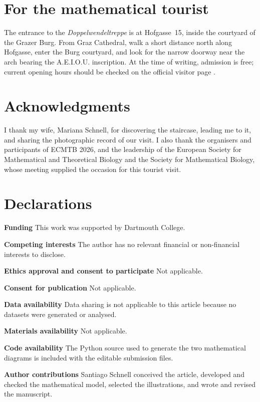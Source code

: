 \documentclass[pdflatex,sn-mathphys-num]{sn-jnl}
\begin{document}
\section{For the mathematical tourist}
The entrance to the \emph{Doppelwendeltreppe} is at Hofgasse~15, inside the courtyard of
the Grazer Burg. From Graz Cathedral, walk a short distance north along Hofgasse,
enter the Burg courtyard, and look for the narrow doorway near the arch bearing
the A.E.I.O.U. inscription. At the time of writing, admission is free; current
opening hours should be checked on the official visitor page
\citep{GrazTourismus}.


\backmatter

\section*{Acknowledgments}
I thank my wife, Mariana Schnell, for discovering the staircase, leading me to it,
and sharing the photographic record of our visit. I also thank the organisers and
participants of ECMTB 2026, and the leadership of the European Society for
Mathematical and Theoretical Biology and the Society for Mathematical Biology,
whose meeting supplied the occasion for this tourist visit.

\section*{Declarations}

\noindent\textbf{Funding} This work was supported by Dartmouth College.

\noindent\textbf{Competing interests} The author has no relevant financial or non-financial interests to disclose.

\noindent\textbf{Ethics approval and consent to participate} Not applicable.

\noindent\textbf{Consent for publication} Not applicable.

\noindent\textbf{Data availability} Data sharing is not applicable to this article because no datasets were generated or analysed.

\noindent\textbf{Materials availability} Not applicable.

\noindent\textbf{Code availability} The Python source used to generate the two mathematical diagrams is included with the editable submission files.

\noindent\textbf{Author contributions} Santiago Schnell conceived the article, developed and checked the mathematical model, selected the illustrations, and wrote and revised the manuscript.


\end{document}
